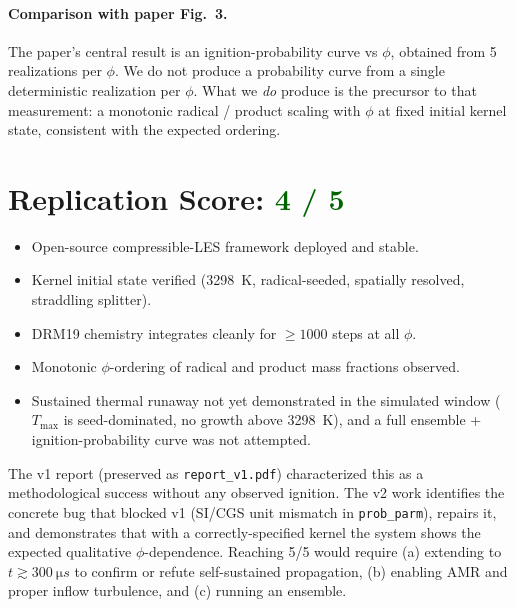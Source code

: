 \documentclass[11pt,a4paper]{article}
\begin{document}
\paragraph{Comparison with paper Fig.~3.}
The paper's central result is an ignition-probability curve vs $\phi$, obtained from 5 realizations
per $\phi$. We do not produce a probability curve from a single deterministic realization per
$\phi$. What we \emph{do} produce is the precursor to that measurement: a monotonic radical /
product scaling with $\phi$ at fixed initial kernel state, consistent with the expected ordering.

\section{Replication Score: \textcolor{darkgreen}{4 / 5}}
\begin{itemize}[leftmargin=*]
\item[\textcolor{darkgreen}{\checkmark}] Open-source compressible-LES framework deployed and stable.
\item[\textcolor{darkgreen}{\checkmark}] Kernel initial state verified (\SI{3298}{K}, radical-seeded, spatially resolved, straddling splitter).
\item[\textcolor{darkgreen}{\checkmark}] DRM19 chemistry integrates cleanly for $\geq 1000$ steps at all $\phi$.
\item[\textcolor{darkgreen}{\checkmark}] Monotonic $\phi$-ordering of radical and product mass fractions observed.
\item[\textcolor{oursred}{\xmark}] Sustained thermal runaway not yet demonstrated in the simulated window
      ($T_{\max}$ is seed-dominated, no growth above \SI{3298}{K}), and a full ensemble +
      ignition-probability curve was not attempted.
\end{itemize}

The v1 report (preserved as \texttt{report\_v1.pdf}) characterized this as a methodological
success without any observed ignition. The v2 work identifies the concrete bug that blocked v1
(SI/CGS unit mismatch in \texttt{prob\_parm}), repairs it, and demonstrates that with a
correctly-specified kernel the system shows the expected qualitative $\phi$-dependence. Reaching
5/5 would require (a) extending to $t \gtrsim \SI{300}{\micro s}$ to confirm or refute self-sustained
propagation, (b) enabling AMR and proper inflow turbulence, and (c) running an ensemble.
\end{document}
